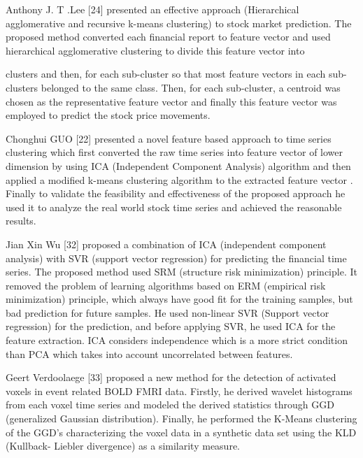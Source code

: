 Anthony J. T .Lee [24] presented an effective approach (Hierarchical agglomerative and recursive k-means clustering) to stock market prediction. The proposed method converted each financial report to feature vector and used hierarchical agglomerative  clustering  to  divide  this  feature  vector  into
 
clusters and then, for each sub-cluster so that most feature vectors in each sub-clusters belonged to the same class. Then, for each sub-cluster, a centroid was chosen as the representative feature vector and finally this feature vector was employed to predict the stock price movements.

Chonghui GUO [22] presented a novel feature based approach to time series clustering which first converted the raw time series into feature vector of lower dimension by using ICA (Independent  Component  Analysis)     algorithm  and  then applied a modified k-means clustering algorithm to the extracted feature vector . Finally to validate the feasibility and effectiveness of the proposed approach he used it to analyze the real world stock time series and achieved the reasonable results.

Jian   Xin   Wu   [32]   proposed   a   combination   of   ICA (independent component analysis) with SVR (support vector regression) for predicting the financial time series. The proposed method used SRM (structure risk minimization) principle.  It  removed  the  problem  of  learning  algorithms based on ERM (empirical risk minimization) principle, which always have good fit for the training samples, but bad prediction for future samples. He used non-linear SVR (Support vector regression) for the prediction, and before applying SVR, he used ICA for the feature extraction. ICA considers independence which is a more strict condition than PCA which takes into account uncorrelated between features.

Geert Verdoolaege [33] proposed a new method for the detection of activated voxels in event related BOLD FMRI data. Firstly, he derived wavelet histograms from each voxel time series and modeled the derived statistics through GGD (generalized Gaussian distribution). Finally, he performed the K-Means clustering of the GGD’s characterizing the voxel data in a synthetic data set using the KLD (Kullback- Liebler divergence) as a similarity measure.


